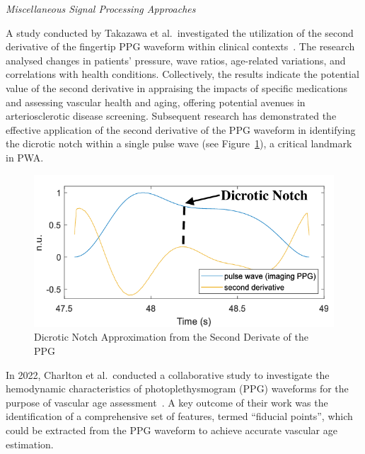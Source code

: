 \vspace{0.2cm}
\textit{Miscellaneous Signal Processing Approaches}
\vspace{0.2cm}

A study conducted by Takazawa et al.\ investigated the utilization of the second derivative of the fingertip PPG waveform within clinical contexts~\cite{takazawaAssessmentVasoactiveAgents1998a}.
The research analysed changes in patients' pressure, wave ratios, age-related variations, and correlations with health conditions.
Collectively, the results indicate the potential value of the second derivative in appraising the impacts of specific medications and assessing vascular health and aging, offering potential avenues in arteriosclerotic disease screening.
Subsequent research has demonstrated the effective application of the second derivative of the PPG waveform in identifying the dicrotic notch within a single pulse wave (see Figure~\ref{fig:dic_notch}), a critical landmark in PWA\@.

\begin{figure}[h]
    \centering
    \includegraphics[scale=0.6]{images/sp/dic_notch}
    \caption{Dicrotic Notch Approximation from the Second Derivate of the PPG~\cite{djeldjliImagingPhotoplethysmographySignal2019}}
    \label{fig:dic_notch}
\end{figure}

In 2022, Charlton et al.\ conducted a collaborative study to investigate the hemodynamic characteristics of photoplethysmogram (PPG) waveforms for the purpose of vascular age assessment~\cite{charltonAssessingHemodynamicsPhotoplethysmogram2022}.
A key outcome of their work was the identification of a comprehensive set of features, termed \enquote{fiducial points}, which could be extracted from the PPG waveform to achieve accurate vascular age estimation.

